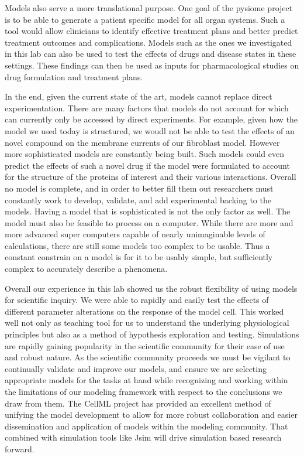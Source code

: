 \documentclass[12pt]{article}
\begin{document}
\par{}
Models also serve a more translational purpose. One goal of the pysiome project is to be able to generate a patient specific model for all organ systems. Such a tool would allow clinicians to identify effective treatment plans and better predict treatment outcomes and complications. Models such as the ones we investigated in this lab can also be used to test the effects of drugs and disease states in these settings. These findings can then be used as inputs for pharmacological studies on drug formulation and treatment plans. 
\par{}
In the end, given the current state of the art, models cannot replace direct experimentation. There are many factors that models do not account for which can currently only be accessed by direct experiments. For example, given how the model we used today is structured, we woudl not be able to test the effects of an novel compound on the membrane currents of our fibroblast model. However more sophisticated models are constantly being built. Such models could even predict the effects of such a novel drug if the model were formulated to account for the structure of the proteins of interest and their various interactions. Overall no model is complete, and in order to better fill them out researchers must constantly work to develop, validate, and add experimental backing to the models. Having a model that is sophisticated is not the only factor as well. The model must also be feasible to process on a computer. While there are more and more advanced super computers capable of nearly unimaginable levels of calculations, there are still some models too complex to be usable. Thus a constant constrain on a model is for it to be usably simple, but sufficiently complex to accurately  describe a phenomena.
\par{}
Overall our experience in this lab showed us the robust flexibility of using models for scientific inquiry. We were able to rapidly and easily test the effects of different parameter alterations on the response of the model cell. This worked well not only as teaching tool for us to understand the underlying physiological principles but also as a method of hypothesis exploration and testing. Simulations are rapidly gaining popularity in the scientific community for their ease of use and robust nature. As the scientific community proceeds we must be vigilant to continually validate and improve our models, and ensure we are selecting appropriate models for the tasks at hand while recognizing and working within the limitations of our modeling framework with respect to the conclusions we draw from them. The CellML project has provided an excellent method of unifying the model development to allow for more robust collaboration and easier dissemination and application of models within the modeling community. That combined with simulation tools like Jsim will drive simulation based research forward.




\end{document}
